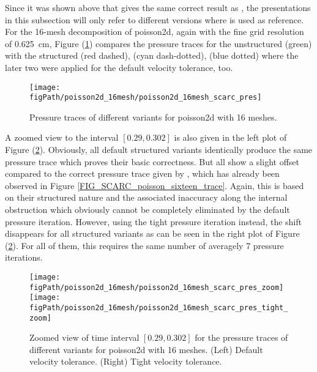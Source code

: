 Since it was shown above that \uscarc{} gives the same correct result as \uglmat{}, the presentations in this subsection will only refer to different \scarc{} versions where \uscarc{} is used as reference. For the 16-mesh decomposition of {\ct poisson2d}, again with the fine grid resolution of 0.625~cm, Figure (\ref{FIG_scarc_poisson_sixteen_scarc_variants_trace}) compares the pressure traces for the unstructured \uscarc{} (green) with the structured \scarcdefault{} (red dashed), \scarctwolevel{} (cyan dash-dotted), \scarcmultigrid{} (blue dotted) where the later two were applied for the default velocity tolerance, too.

\begin{figure}[ht]
\begin{center}
\texttt{[image: \\figPath/poisson2d\_16mesh/poisson2d\_16mesh\_scarc\_pres]}
\end{center}
\caption[Pressure traces of different \scarc{} variants for {\ct poisson2d} with 16 meshes]{Pressure traces of different \scarc{} variants for {\ct poisson2d} with 16 meshes.}
\label{FIG_scarc_poisson_sixteen_scarc_variants_trace}
\end{figure}

A zoomed view to the interval $[0.29,0.302]$ is also given in the left plot of Figure (\ref{FIG_scarc_poisson_sixteen_scarc_variants_zoom}). Obviously, all default structured \scarc{} variants identically produce the same pressure trace which proves their basic correctness. But all show a slight offset compared to the correct pressure trace given by \uscarc{}, which has already been observed in Figure \ref{FIG_SCARC_poisson_sixteen_trace}. Again, this is based on their structured nature and the associated inaccuracy along the internal obstruction which obviously cannot be completely eliminated by the default pressure iteration. However, using the tight pressure iteration instead, the shift disappears for all structured variants as can be seen in the right plot of Figure (\ref{FIG_scarc_poisson_sixteen_scarc_variants_zoom}). For all of them, this requires the same number of averagely 7 pressure iterations.

\begin{figure}[ht]
\begin{center}
\texttt{[image: \\figPath/poisson2d\_16mesh/poisson2d\_16mesh\_scarc\_pres\_zoom]}
\texttt{[image: \\figPath/poisson2d\_16mesh/poisson2d\_16mesh\_scarc\_pres\_tight\_zoom]}
\end{center}
\caption[Pressure traces of different \scarc{} variants for {\ct poisson2d} with 16 meshes]{Zoomed view of time interval $[0.29, 0.302]$ for the pressure traces of different \scarc{} variants for {\ct poisson2d} with 16 meshes. (Left) Default velocity tolerance. (Right) Tight velocity tolerance.}
\label{FIG_scarc_poisson_sixteen_scarc_variants_zoom}
\end{figure}


